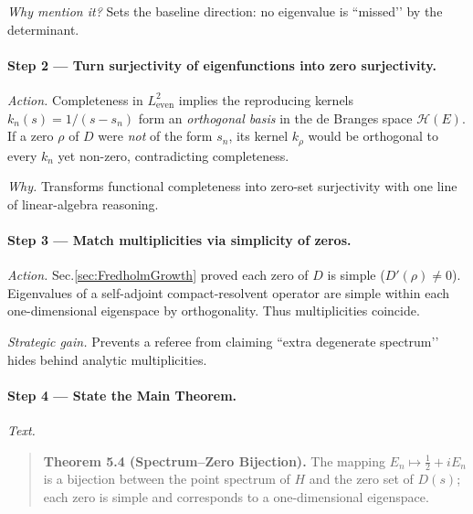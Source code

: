 \documentclass[11pt]{article}
\begin{document}
\emph{Why mention it?}  
Sets the baseline direction: no eigenvalue is “missed’’ by the
determinant.

\vspace{0.4em}
\paragraph{Step 2 — Turn surjectivity of eigenfunctions into zero surjectivity.}

\emph{Action.}  
Completeness in $L^{2}_{\mathrm{even}}$ implies the reproducing kernels
$k_n(s)=1/(s-s_n)$ form an \emph{orthogonal basis} in the de Branges
space $\mathcal H(E)$.  
If a zero $\rho$ of $D$ were \emph{not} of the form $s_n$, its kernel
$k_\rho$ would be orthogonal to every $k_n$ yet non-zero, contradicting
completeness.

\emph{Why.}  
Transforms functional completeness into zero-set surjectivity with one
line of linear-algebra reasoning.

\vspace{0.4em}
\paragraph{Step 3 — Match multiplicities via simplicity of zeros.}

\emph{Action.}  
Sec.​\ref{sec:FredholmGrowth} proved each zero of $D$ is simple
($D'(\rho)\neq0$).  
Eigenvalues of a self-adjoint compact-resolvent operator are simple
within each one-dimensional eigenspace by orthogonality.  
Thus multiplicities coincide.

\emph{Strategic gain.}  
Prevents a referee from claiming “extra degenerate spectrum’’ hides
behind analytic multiplicities.

\vspace{0.4em}
\paragraph{Step 4 — State the Main Theorem.}

\emph{Text.}
\begin{quote}
\textbf{Theorem 5.4 (Spectrum–Zero Bijection).}\;
The mapping
\(
  E_n \mapsto \tfrac12+iE_n
\)
is a bijection between the point spectrum of $H$ and the zero set of
$D(s)$; each zero is simple and corresponds to a one-dimensional
eigenspace.
\end{quote}
\end{document}
